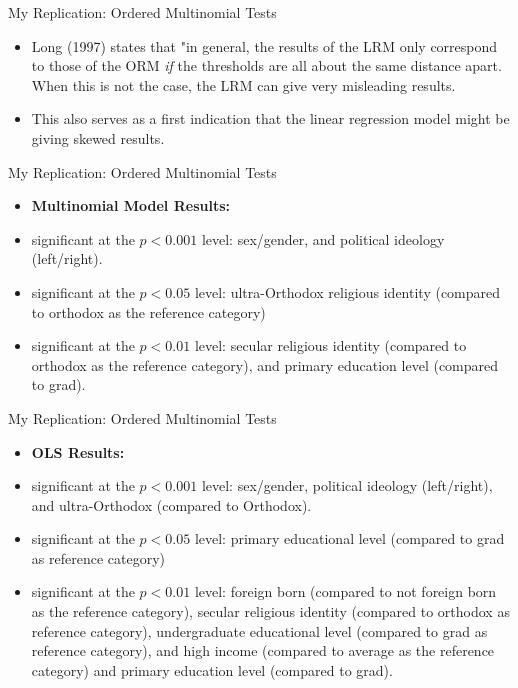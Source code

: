\documentclass{beamer}
\begin{document}
\begin{frame}{My Replication: Ordered Multinomial Tests}
	\begin{itemize}
		\item Long (1997) states that "in general, the results of the LRM only correspond to those of the ORM \textit{if} the thresholds are all about the same distance apart. When this is not the case, the LRM can give very misleading results.
		\item This also serves as a first indication that the linear regression model might be giving skewed results.
	\end{itemize}
\end{frame}

\begin{frame}{My Replication: Ordered Multinomial Tests}
\begin{itemize}
	\item \textbf{Multinomial Model Results:} 
	\item significant at the $p<0.001$ level: sex/gender, and political ideology (left/right). 
	\item significant at the $p<0.05$ level: ultra-Orthodox religious identity (compared to orthodox as the reference category)
	\item significant at the $p<0.01$ level: secular religious identity (compared to orthodox as the reference category), and primary education level (compared to grad).
\end{itemize}
\end{frame}

\begin{frame}{My Replication: Ordered Multinomial Tests}
	\begin{itemize}
		\item \textbf{OLS Results:} 
		\item significant at the $p<0.001$ level: sex/gender, political ideology (left/right), and ultra-Orthodox (compared to Orthodox). 
		\item significant at the $p<0.05$ level: primary educational level (compared to grad as reference category)
		\item significant at the $p<0.01$ level: foreign born (compared to not foreign born as the reference category), secular religious identity (compared to orthodox as reference category), undergraduate educational level (compared to grad as reference category), and high income (compared to average as the reference category) and primary education level (compared to grad).
	\end{itemize}
\end{frame}
\end{document}
